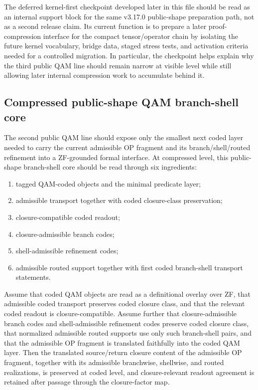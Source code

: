 \begin{remark}\label{rem:qam-roadmap-checkpoint-fit}
The deferred kernel-first checkpoint developed later in this file should be read as an internal support block for the same v3.17.0 public-shape preparation path, not as a second release claim. Its current function is to prepare a later proof-compression interface for the compact tensor/operator chain by isolating the future kernel vocabulary, bridge data, staged stress tests, and activation criteria needed for a controlled migration. In particular, the checkpoint helps explain why the third public QAM line should remain narrow at visible level while still allowing later internal compression work to accumulate behind it.
\end{remark}

\subsection*{Compressed public-shape QAM branch-shell core}
The second public QAM line should expose only the smallest next coded layer needed to carry the current admissible OP fragment and its branch/shell/routed refinement into a ZF-grounded formal interface. At compressed level, this public-shape branch-shell core should be read through six ingredients:
\begin{enumerate}[leftmargin=2em]
  \item tagged QAM-coded objects and the minimal predicate layer;
  \item admissible transport together with coded closure-class preservation;
  \item closure-compatible coded readout;
  \item closure-admissible branch codes;
  \item shell-admissible refinement codes;
  \item admissible routed support together with first coded branch-shell transport statements.
\end{enumerate}

\begin{theorem}
Assume that coded QAM objects are read as a definitional overlay over ZF, that admissible coded transport preserves coded closure class, and that the relevant coded readout is closure-compatible. Assume further that closure-admissible branch codes and shell-admissible refinement codes preserve coded closure class, that normalized admissible routed supports use only such branch-shell pairs, and that the admissible OP fragment is translated faithfully into the coded QAM layer. Then the translated source/return closure content of the admissible OP fragment, together with its admissible branchwise, shellwise, and routed realizations, is preserved at coded level, and closure-relevant readout agreement is retained after passage through the closure-factor map.
\end{theorem}


